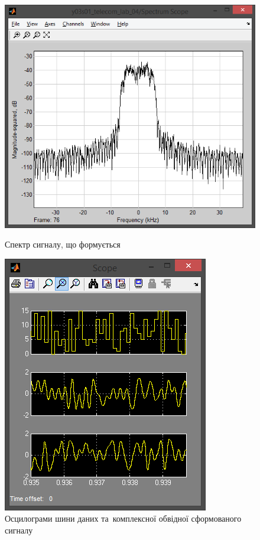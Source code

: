 \documentclass[
	a4paper,
	oneside,
	BCOR = 10mm,
	DIV = 12,
	12pt,
	headings = normal,
]{scrartcl}
\begin{document}
				\begin{figure}[!htbp]
					\begin{minipage}[t]{0.5\textwidth - 0.5em}
						\centering
						\includegraphics[height = 8\baselineskip]{../01-solution/rolloff-0p4-spectrum-scope.png}
						\caption{Спектр сигналу, що формується}
						\label{fig:rolloff-0p4-spectrum-scope}
					\end{minipage}\hspace{1em}%
					\begin{minipage}[t]{0.5\textwidth - 0.5em}
						\centering
						\includegraphics[height = 8\baselineskip]{../01-solution/rolloff-0p4-scope.png}
						\caption{Осцилограми шини даних та~комплексної обвідної сформованого сигналу}
						\label{fig:rolloff-0p4-scope}
					\end{minipage}%
				\end{figure}
\end{document}
